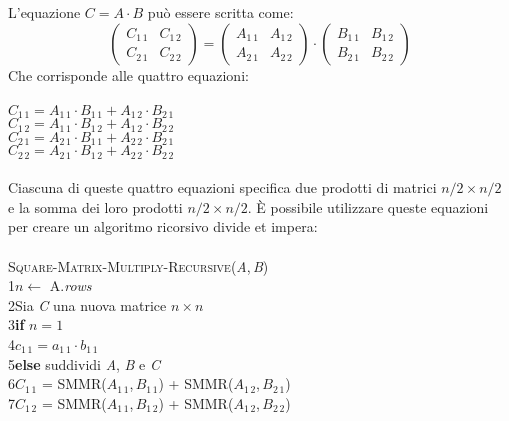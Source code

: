 \documentclass[10pt, a4paper]{report}
\newcommand\firsttab[1][0.5cm]{\hspace*{#1}}
\newcommand\secondtab[1][1cm]{\hspace*{#1}}
\begin{document}
L'equazione $C = A \cdot B$ può essere scritta come:
\begin{displaymath}
\left(\begin{array}{cc}
C_{1\,1} &C_{1\,2}\\
C_{2\,1} &C_{2\,2}
\end{array}\right) = \left(\begin{array}{cc}
A_{1\,1} &A_{1\,2}\\
A_{2\,1} &A_{2\,2}
\end{array}\right) \cdot \left(\begin{array}{cc}
B_{1\,1} &B_{1\,2}\\
B_{2\,1} &B_{2\,2}
\end{array}\right)
\end{displaymath}
Che corrisponde alle quattro equazioni:\\\\
$C_{1\,1} = A_{1\,1} \cdot B_{1\,1} + A_{1\,2} \cdot B_{2\,1}$ \\
$C_{1\,2} = A_{1\,1} \cdot B_{1\,2} + A_{1\,2} \cdot B_{2\,2}$ \\
$C_{2\,1} = A_{2\,1} \cdot B_{1\,1} + A_{2\,2} \cdot B_{2\,1}$ \\
$C_{2\,2} = A_{2\,1} \cdot B_{1\,2} + A_{2\,2} \cdot B_{2\,2}$ \\\\
Ciascuna di queste quattro equazioni specifica due prodotti di matrici $n/2 \times n/2$ e la somma dei loro prodotti $n/2 \times n/2$. È possibile utilizzare queste equazioni per creare un algoritmo ricorsivo divide et impera:\\\\
\textsc{Square-Matrix-Multiply-Recursive(\textit{A},\,\textit{B})}\\
1\firsttab $n \leftarrow$ A.\textit{rows}\\
2\firsttab Sia \textit{C} una nuova matrice $n \times n$\\
3\firsttab\textbf{if} $n = 1$\\
4\secondtab$c_{1\,1} = a_{1\,1} \cdot b_{1\,1}$\\
5\firsttab\textbf{else} suddividi \textit{A}, \textit{B} e \textit{C} \\
6\secondtab\textit{$C_{1\,1}$} = \textsc{SMMR(\textit{$A_{1\,1}$},\,\textit{$B_{1\,1}$})} + \textsc{SMMR(\textit{$A_{1\,2}$},\,\textit{$B_{2\,1}$})} \\
7\secondtab\textit{$C_{1\,2}$} = \textsc{SMMR(\textit{$A_{1\,1}$},\,\textit{$B_{1\,2}$})} + \textsc{SMMR(\textit{$A_{1\,2}$},\,\textit{$B_{2\,2}$})} \\
\end{document}
